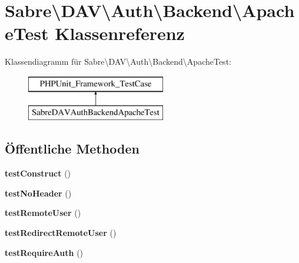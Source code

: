\hypertarget{class_sabre_1_1_d_a_v_1_1_auth_1_1_backend_1_1_apache_test}{}\section{Sabre\textbackslash{}D\+AV\textbackslash{}Auth\textbackslash{}Backend\textbackslash{}Apache\+Test Klassenreferenz}
\label{class_sabre_1_1_d_a_v_1_1_auth_1_1_backend_1_1_apache_test}
Klassendiagramm für Sabre\textbackslash{}D\+AV\textbackslash{}Auth\textbackslash{}Backend\textbackslash{}Apache\+Test\+:\begin{figure}[H]
\begin{center}
\leavevmode
\includegraphics[height=2.000000cm]{class_sabre_1_1_d_a_v_1_1_auth_1_1_backend_1_1_apache_test}
\end{center}
\end{figure}
\subsection*{Öffentliche Methoden}
\begin{DoxyCompactItemize}
\item 
\mbox{\label{class_sabre_1_1_d_a_v_1_1_auth_1_1_backend_1_1_apache_test_ae9e4b20055d74799b101a770cb3c23b4}} 
{\bfseries test\+Construct} ()
\item 
\mbox{\label{class_sabre_1_1_d_a_v_1_1_auth_1_1_backend_1_1_apache_test_a91cd4a8b3c2de513f2020381739981ba}} 
{\bfseries test\+No\+Header} ()
\item 
\mbox{\label{class_sabre_1_1_d_a_v_1_1_auth_1_1_backend_1_1_apache_test_a742c2816db2511ae847745da4dc02f21}} 
{\bfseries test\+Remote\+User} ()
\item 
\mbox{\label{class_sabre_1_1_d_a_v_1_1_auth_1_1_backend_1_1_apache_test_a3ca39d19df584940cd488d4f4ea06dde}} 
{\bfseries test\+Redirect\+Remote\+User} ()
\item 
\mbox{\label{class_sabre_1_1_d_a_v_1_1_auth_1_1_backend_1_1_apache_test_a335e283fbc220e14922c1ee1707671b1}} 
{\bfseries test\+Require\+Auth} ()
\end{DoxyCompactItemize}


